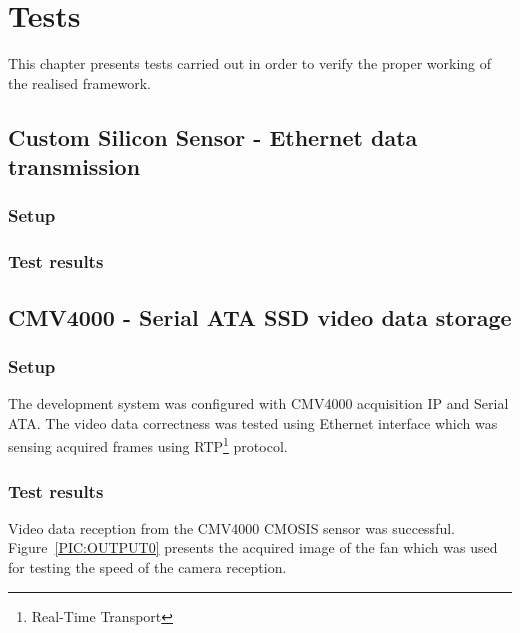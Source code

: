 \chapter{Tests}
\label{ch6:tests}

This chapter presents tests carried out in order to verify the proper working of the realised framework. 



\section{Custom Silicon Sensor - Ethernet data transmission}

\subsection{Setup}
\subsection{Test results}


\section{CMV4000 - Serial ATA SSD video data storage}

\subsection{Setup}
The development system was configured with CMV4000 acquisition IP and Serial ATA. The video data correctness was tested
using Ethernet interface which was sensing acquired frames using RTP\footnote{Real-Time Transport} protocol. 

\subsection{Test results}
Video data reception from the CMV4000 CMOSIS sensor was successful. Figure~\ref{PIC:OUTPUT0} presents the acquired image
of the fan which was used for testing the speed of the camera reception.

